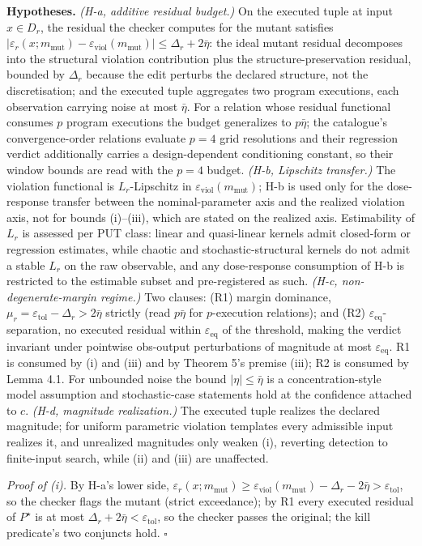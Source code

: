 \documentclass[manuscript,screen,review]{acmart}
\begin{document}
\textbf{Hypotheses.} \emph{(H-a, additive residual budget.)} On the
executed tuple at input $x\in D_r$, the residual the checker computes
for the mutant satisfies
$|\varepsilon_r(x;m_{\mathrm{mut}})-\varepsilon_{\mathrm{viol}}(m_{\mathrm{mut}})|\le\Delta_r+2\bar\eta$:
the ideal mutant residual decomposes into the structural violation
contribution plus the structure-preservation residual, bounded by
$\Delta_r$ because the edit perturbs the declared structure, not the
discretisation; and the executed tuple aggregates two program
executions, each observation carrying noise at most $\bar\eta$. For a
relation whose residual functional consumes $p$ program executions the
budget generalizes to $p\bar\eta$; the catalogue's convergence-order
relations evaluate $p=4$ grid resolutions and their regression verdict
additionally carries a design-dependent conditioning constant, so their
window bounds are read with the $p=4$ budget. \emph{(H-b, Lipschitz
transfer.)} The violation functional is $L_r$-Lipschitz in
$\varepsilon_{\mathrm{viol}}(m_{\mathrm{mut}})$; H-b is used only for
the dose-response transfer between the nominal-parameter axis and the
realized violation axis, not for bounds (i)--(iii), which are stated on
the realized axis. Estimability of $L_r$ is assessed per PUT class:
linear and quasi-linear kernels admit closed-form or regression
estimates, while chaotic and stochastic-structural kernels do not admit
a stable $L_r$ on the raw observable, and any dose-response consumption
of H-b is restricted to the estimable subset and pre-registered as
such. \emph{(H-c, non-degenerate-margin regime.)} Two
clauses: (R1) margin dominance,
$\mu_r=\varepsilon_{\mathrm{tol}}-\Delta_r>2\bar\eta$ strictly (read
$p\bar\eta$ for $p$-execution relations); and (R2)
$\varepsilon_{\mathrm{eq}}$-separation, no executed residual within
$\varepsilon_{\mathrm{eq}}$ of the threshold, making the verdict
invariant under pointwise obs-output perturbations of magnitude at most
$\varepsilon_{\mathrm{eq}}$. R1 is consumed by (i) and (iii) and by
Theorem 5's premise (iii); R2 is consumed by Lemma 4.1. For unbounded
noise the bound $|\eta|\le\bar\eta$ is a concentration-style model
assumption and stochastic-case statements hold at the confidence
attached to $c$. \emph{(H-d, magnitude realization.)} The executed
tuple realizes the declared magnitude; for uniform parametric violation
templates every admissible input realizes it, and unrealized magnitudes
only weaken (i), reverting detection to finite-input search, while (ii)
and (iii) are unaffected.

\emph{Proof of (i).} By H-a's lower side,
$\varepsilon_r(x;m_{\mathrm{mut}})\ge\varepsilon_{\mathrm{viol}}(m_{\mathrm{mut}})-\Delta_r-2\bar\eta>\varepsilon_{\mathrm{tol}}$,
so the checker flags the mutant (strict exceedance); by R1 every
executed residual of $P^\star$ is at most
$\Delta_r+2\bar\eta<\varepsilon_{\mathrm{tol}}$, so the checker passes
the original; the kill predicate's two conjuncts hold. $\square$
\end{document}
